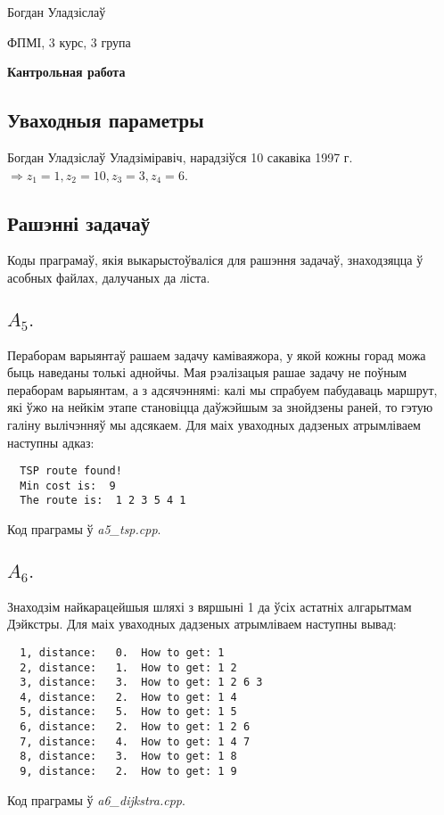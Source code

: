 \documentclass{article}
\begin{document}
{\large

Богдан Уладзіслаў

ФПМІ, 3 курс, 3 група

\vspace{5mm}

\textbf{Кантрольная работа}

}

\vspace{10mm}

\subsection*{Уваходныя параметры}

Богдан Уладзіслаў Уладзіміравіч, нарадзіўся 10 сакавіка 1997 г. $\Rightarrow z_1 = 1, z_2 = 10, z_3 = 3, z_4 = 6$.

\subsection*{Рашэнні задачаў}

Коды праграмаў, якія выкарыстоўваліся для рашэння задачаў, знаходзяцца ў асобных файлах, далучаных да ліста.

\subsection*{$A_5.$}
Пераборам варыянтаў рашаем задачу каміваяжора, у якой кожны горад можа быць наведаны толькі аднойчы.
Мая рэалізацыя рашае задачу не поўным пераборам варыянтам, а з адсячэннямі: калі мы спрабуем пабудаваць
маршрут, які ўжо на нейкім этапе становіцца даўжэйшым за знойдзены раней, то гэтую галіну вылічэнняў мы адсякаем.
Для маіх уваходных дадзеных атрымліваем наступны адказ:
\begin{verbatim}
  TSP route found!
  Min cost is:  9
  The route is:  1 2 3 5 4 1
\end{verbatim}
Код праграмы ў \textit{a5\_tsp.cpp}.

\subsection*{$A_6.$}
Знаходзім найкарацейшыя шляхі з вяршыні 1 да ўсіх астатніх алгарытмам Дэйкстры.
Для маіх уваходных дадзеных атрымліваем наступны вывад:
\begin{verbatim}
  1, distance:   0.  How to get: 1
  2, distance:   1.  How to get: 1 2
  3, distance:   3.  How to get: 1 2 6 3
  4, distance:   2.  How to get: 1 4
  5, distance:   5.  How to get: 1 5
  6, distance:   2.  How to get: 1 2 6
  7, distance:   4.  How to get: 1 4 7
  8, distance:   3.  How to get: 1 8
  9, distance:   2.  How to get: 1 9
\end{verbatim}
Код праграмы ў \textit{a6\_dijkstra.cpp}.
\end{document}
